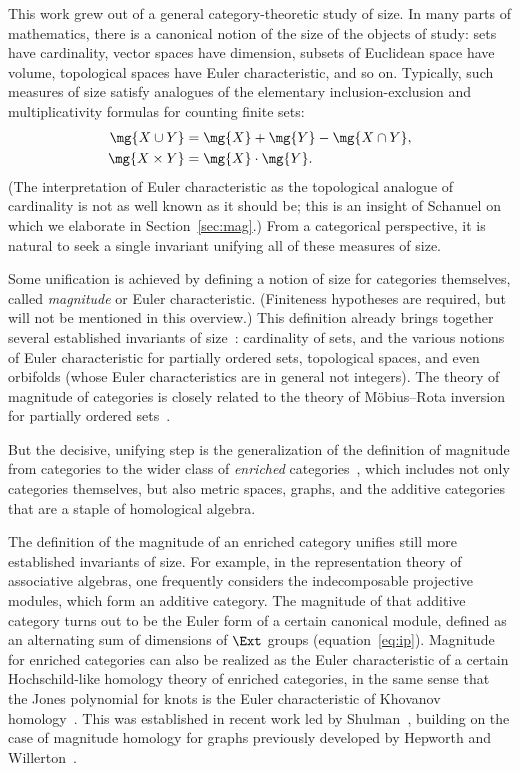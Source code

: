 \introbreak

This work grew out of a general category-theoretic%
%
%
study of size. In many parts of mathematics, there is a
canonical notion of the size of the objects of study: sets have
cardinality, vector spaces have dimension, subsets of Euclidean space have
volume, topological spaces have Euler%
%
%
characteristic, and so on.  Typically, such measures of size satisfy
analogues of the elementary inclusion-exclusion and multiplicativity
formulas for counting finite sets:
% 
\begin{align*}
\mg{X \cup Y}   &= \mg{X} + \mg{Y} - \mg{X \cap Y},     \\
\mg{X \times Y} &= \mg{X} \cdot \mg{Y}.
\end{align*}
% 
(The interpretation of Euler characteristic as the topological analogue of
cardinality is not as well known as it should be; this is an insight of
Schanuel%
%
% 
on which we elaborate in Section~\ref{sec:mag}.)  From a
categorical perspective, it is natural to seek a single invariant unifying
all of these measures of size.

Some unification is achieved by defining a notion of size for categories
themselves, called \emph{magnitude} or Euler
characteristic.  (Finiteness hypotheses are required, but will not be
mentioned in this overview.)  This definition already brings together
several established invariants of size~\cite{ECC}: cardinality of
sets, and the various notions of Euler characteristic for partially ordered
sets, topological spaces, and even orbifolds (whose Euler characteristics
are in general not integers).  The theory of magnitude of categories is
closely related to the theory of M\"obius--Rota inversion for partially
ordered sets~\cite{RotaFCT,NMI}.

But the decisive, unifying step is the generalization of the definition of
magnitude from categories to the wider class of \emph{enriched}%
%
% 
categories~\cite{MMS}, which includes not only categories
themselves, but also metric spaces, graphs, and the additive categories
that are a staple of homological algebra.

The definition of the magnitude of an enriched category unifies still more
established invariants of size.  For example, in the representation theory
of associative algebras, one frequently considers the indecomposable
projective modules, which form an additive category.  The magnitude of that
additive category turns out to be the Euler form of a certain canonical
module, defined as an alternating sum of dimensions of $\Ext$ groups
(equation~\eqref{eq:ip}).  Magnitude for enriched categories can also be
realized as the Euler characteristic of a certain Hochschild-like homology%
%
% 
theory of enriched categories, in the same sense that the Jones polynomial
for knots is the Euler characteristic of Khovanov homology~\cite{Khov}.
This was established in recent work led by Shulman~\cite{MHECMS}, building
on the case of magnitude homology for graphs previously developed by
Hepworth and Willerton~\cite{HeWi}. 

